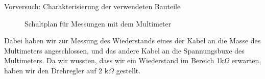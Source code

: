 \documentclass[twoside]{protokoll}
\begin{document}
\begin{aufgabe}{Vorversuch: Charakterisierung der verwendeten Bauteile}
  \begin{figure}[H]
      \centering
      \hfill
      \caption{Schaltplan für Messungen mit dem Multimeter}
  \end{figure}

Dabei haben wir zur Messung des Wiederstands eines der Kabel an die Masse des Multimeters angeschlossen, und das andere Kabel an die Spannungsbuxe des Multimeters. Da wir wussten, dass wir ein Wiederstand im Bereich 1k$\Omega$ erwarten, haben wir den Drehregler auf 2 k$\Omega$ gestellt.\\ 


\end{aufgabe}
\end{document}
